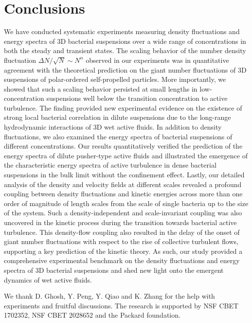 \documentclass[twocolumn,aps,prx,amsmath,amssymb,longbibliography]{revtex4-2}
\begin{document}
\section{Conclusions}

We have conducted systematic experiments measuring density fluctuations and energy spectra of 3D bacterial suspensions over a wide range of concentrations in both the steady and transient states. The scaling behavior of the number density fluctuation $\Delta N/\sqrt N \sim N^\alpha$ observed in our experiments was in quantitative agreement with the theoretical prediction on the giant number fluctuations of 3D suspensions of polar-ordered self-propelled particles. More importantly, we showed that such a scaling behavior persisted at small lengths in low-concentration suspensions well below the transition concentration to active turbulence. The finding provided new experimental evidence on the existence of strong local bacterial correlation in dilute suspensions due to the long-range hydrodynamic interactions of 3D wet active fluids. In addition to density fluctuations, we also examined the energy spectra of bacterial suspensions of different concentrations. Our results quantitatively verified the prediction of the energy spectra of dilute pusher-type active fluids and illustrated the emergence of the characteristic energy spectra of active turbulence in dense bacterial suspensions in the bulk limit without the confinement effect. Lastly, our detailed analysis of the density and velocity fields at different scales revealed a profound coupling between density fluctuations and kinetic energies across more than one order of magnitude of length scales from the scale of single bacteria up to the size of the system. Such a density-independent and scale-invariant coupling was also uncovered in the kinetic process during the transition towards bacterial active turbulence. This density-flow coupling also resulted in the delay of the onset of giant number fluctuations with respect to the rise of collective turbulent flows, supporting a key prediction of the kinetic theory. As such, our study provided a comprehensive experimental benchmark on the density fluctuations and energy spectra of 3D bacterial suspensions and shed new light onto the emergent dynamics of wet active fluids.

\begin{acknowledgements}
	We thank D. Ghosh, Y. Peng, Y. Qiao and K. Zhang for the help with experiments and fruitful discussions. The research is supported by NSF CBET 1702352, NSF CBET 2028652 and the Packard foundation.
\end{acknowledgements}
\end{document}
